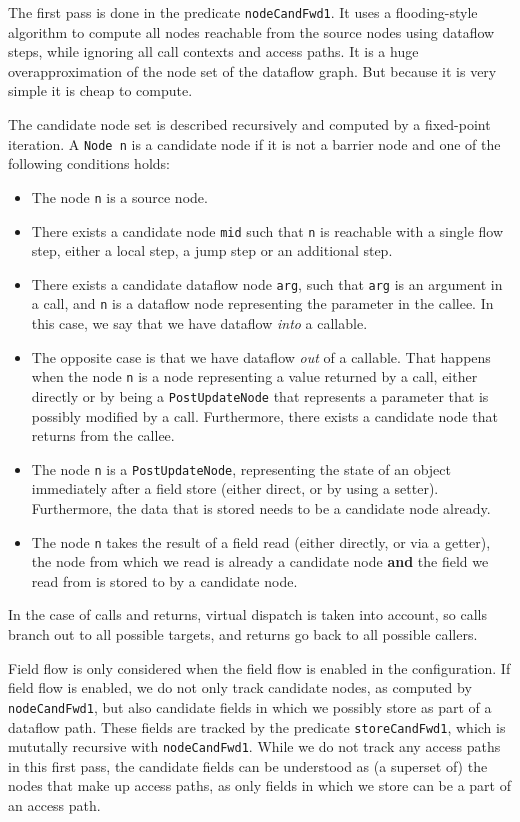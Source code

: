 The first pass is done in the predicate \texttt{nodeCandFwd1}.
It uses a flooding-style algorithm to compute all nodes reachable from the source nodes
using dataflow steps, while ignoring all call contexts and access paths.
It is a huge overapproximation of the node set of the dataflow graph.
But because it is very simple it is cheap to compute.

The candidate node set is described recursively and computed by a fixed-point
iteration.
A \texttt{Node n} is a candidate node if it is not a barrier node and 
one of the following conditions holds:
\begin{itemize}
    \item The node \texttt{n} is a source node.
    \item There exists a candidate node \texttt{mid} such that \texttt{n} is reachable with a single flow step,
    either a local step, a jump step or an additional step.
    \item There exists a candidate dataflow node \texttt{arg}, such that 
    \texttt{arg} is an argument in a call, and \texttt{n} is a dataflow node 
    representing the parameter in the callee.
    In this case, we say that we have dataflow \emph{into} a callable.
    \item The opposite case is that we have dataflow \emph{out} of a callable.
    That happens when the node \texttt{n} is a node representing a value returned by 
    a call, either directly or by being a \texttt{PostUpdateNode} that
    represents a parameter that is possibly modified by a call.
    Furthermore, there exists a candidate node that returns from the callee.
    \item The node \texttt{n} is a \texttt{PostUpdateNode}, representing the state of an 
    object immediately after a field store (either direct, or by using a setter).
    Furthermore, the data that is stored needs to be a candidate node already.
    \item The node \texttt{n} takes the result of a field read 
    (either directly, or via a getter), the node from which we read is already a
    candidate node \textbf{and} the field we read from is stored to 
    by a candidate node.
\end{itemize}
In the case of calls and returns, virtual dispatch is taken into account,
so calls branch out to all possible targets, and returns go back to all possible callers.

Field flow is only considered when the field flow is enabled in the configuration.
If field flow is enabled, we do not only track candidate nodes, as computed by 
\texttt{nodeCandFwd1}, but also candidate fields in which we possibly store as
part of a dataflow path.
These fields are tracked by the predicate \texttt{storeCandFwd1}, which is mututally 
recursive with \texttt{nodeCandFwd1}.
While we do not track any access paths in this first pass,
the candidate fields can be understood as (a superset of) the nodes that make up 
access paths, as only fields in which we store can be a part of an access path.

